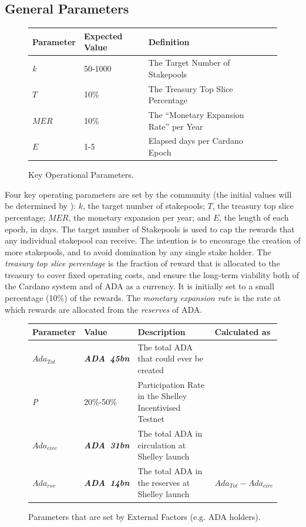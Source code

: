\documentclass[11pt,a4paper,dvipsnames,twosided,final]{article}
\newcommand{\ada}{ADA{}}
\newcommand{\ADA}[1]{\textbf{\emph{\ada~{#1}}}}
\newcommand{\cardano}[1]{Cardano}
\begin{document}
\newpage
\subsection{General Parameters}

\begin{figure}[h!]
\begin{center}
\begin{tabular}{||l|l|p{10cm}|l||}
  \hline \hline
\textbf{Parameter} & \textbf{Expected Value} & \textbf{Definition} \\\hline
\emph{k} & 50-1000 & The Target Number of Stakepools \\\hline
$T$ & 10\% & The Treasury Top Slice Percentage \\\hline
$MER$ & 10\% &  The ``Monetary Expansion Rate'' per Year \\\hline
$E$ & 1-5 &  Elapsed days per \cardano{} Epoch \\\hline
  \hline
\end{tabular}
\end{center}
\caption{Key Operational Parameters.}
\end{figure}

\noindent
Four key operating parameters are set by the community (the initial values will be determined by \IOHK):
$k$, the target number of stakepools;
$T$, the treasury top slice percentage;
$MER$, the monetary expansion per year;
and
$E$, the length of each epoch, in days.
%
The target number of Stakepools is used to cap the rewards that any individual stakepool can receive. The intention is to encourage the creation of more stakepools, and to avoid domination by any single stake holder.
The \emph{treasury top slice percentage} is the fraction of reward that is allocated to the treasury to cover fixed operating costs, and
ensure the long-term viability both of the \cardano{} system and of \ada{} as a currency.  It is initially set to a small percentage (10\%) of the rewards.
The \emph{monetary expansion rate} is the rate at which rewards are allocated from the \emph{reserves} of \ada{}.

\begin{figure}[h!]
\begin{center}
\begin{tabular}{||l|l|p{6cm}|l||}
  \hline \hline
\textbf{Parameter} & \textbf{Value} & \textbf{Description} & \textbf{Calculated as} \\\hline
${Ada}_{Tot}$ & \ADA{45bn} & The total \ada{} that could ever be created & \\\hline
\emph{P} & 20\%-50\% & Participation Rate in the Shelley Incentivised Testnet & \\\hline
${Ada}_{circ}$ & \ADA{31bn} & The total \ada{} in circulation at Shelley launch & \\\hline
${Ada}_{rsv}$ & \ADA{14bn} & The total \ada{} in the reserves at Shelley launch & ${Ada}_{Tot} - {Ada}_{circ}$ \\\hline
\hline
\end{tabular}
\end{center}
\caption{Parameters that are set by External Factors (e.g. \ada{} holders).}
\end{figure}
\end{document}

